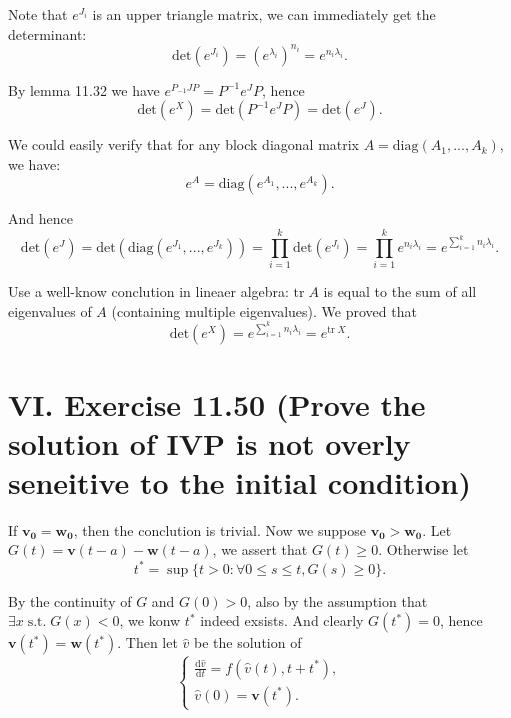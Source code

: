\documentclass[twoside,a4paper]{article}
\begin{document}
Note that $e^{J_i}$ is an upper triangle matrix, we can immediately get the determinant:
\begin{equation*}
    \text{det}(e^{J_i})=\left(e^{\lambda_i}\right)^{n_i}=e^{n_i\lambda_i}.
\end{equation*}

By lemma 11.32 we have $e^{P_{-1}JP}=P^{-1}e^J P$, hence 
\begin{equation*}
    \text{det}(e^X)=\text{det}(P^{-1} e^J P)=\text{det}(e^J).
\end{equation*}

We could easily verify that for any block diagonal matrix $A=\text{diag}(A_1,...,A_k)$, we have:
\begin{equation*}
    e^A=\text{diag}(e^{A_1},...,e^{A_k}).
\end{equation*}

And hence
\begin{equation*}
    \text{det}(e^J)=\text{det} (\text{diag}(e^{J_1},...,e^{J_k})) = \prod_{i=1}^k \text{det}(e^{J_i})=\prod_{i=1}^k e^{n_i\lambda_i}=e^{\sum_{i=1}^k n_i\lambda_i}.
\end{equation*}

Use a well-know conclution in lineaer algebra: $\text{tr}\;A$ is equal to the sum of all eigenvalues of $A$ (containing multiple eigenvalues). We proved that
\begin{equation*}
    \text{det}(e^X)=e^{\sum_{i=1}^k n_i\lambda_i}=e^{\text{tr}\;X}.
\end{equation*}

\section*{VI. Exercise 11.50 (Prove the solution of IVP is not overly seneitive to the initial condition)}

\;\;\;\; If $\mathbf{v_0}=\mathbf{w_0}$, then the conclution is trivial. Now we suppose $\mathbf{v_0}>\mathbf{w_0}$. Let $G(t)=\mathbf{v}(t-a)-\mathbf{w}(t-a)$, we assert that $G(t)\geq 0$. Otherwise let
\begin{equation*}
    t^* = \sup\{t>0:\forall 0\leq s\leq t, G(s)\geq 0\}.
\end{equation*}

By the continuity of $G$ and $G(0)>0$, also by the assumption that $\exists x\;\text{s.t.}\; G(x)<0$, we konw $t^*$ indeed exsists. And clearly $G(t^*)=0$, hence $\mathbf{v}(t^*)=\mathbf{w}(t^*)$. Then let $\hat{v}$ be the solution of
\begin{equation*}
    \left\{\begin{array}{l}
        \frac{\text{d} \hat{v}}{\text{d}t}=f(\hat{v}(t),t+t^*),\\
        \hat{v}(0)=\mathbf{v}(t^*).
    \end{array}\right.
\end{equation*}
\end{document}

